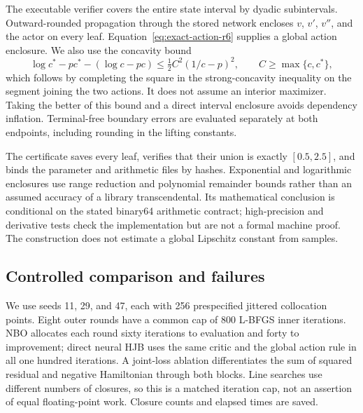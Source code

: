 The executable verifier covers the entire state interval by dyadic subintervals. Outward-rounded propagation through the stored network encloses $v$, $v'$, $v''$, and the actor on every leaf. Equation~\eqref{eq:exact-action-r6} supplies a global action enclosure. We also use the concavity bound
\begin{equation}\label{eq:concavity-gap-r6}
 \log c^*-pc^*-(\log c-pc)
 \leq \tfrac12 C^2(1/c-p)^2,\qquad C\geq\max\{c,c^*\},
\end{equation}
which follows by completing the square in the strong-concavity inequality on the segment joining the two actions. It does not assume an interior maximizer. Taking the better of this bound and a direct interval enclosure avoids dependency inflation. Terminal-free boundary errors are evaluated separately at both endpoints, including rounding in the lifting constants.

The certificate saves every leaf, verifies that their union is exactly $[0.5,2.5]$, and binds the parameter and arithmetic files by hashes. Exponential and logarithmic enclosures use range reduction and polynomial remainder bounds rather than an assumed accuracy of a library transcendental. Its mathematical conclusion is conditional on the stated binary64 arithmetic contract; high-precision and derivative tests check the implementation but are not a formal machine proof. The construction does not estimate a global Lipschitz constant from samples.

\subsection{Controlled comparison and failures}
We use seeds 11, 29, and 47, each with 256 prespecified jittered collocation points. Eight outer rounds have a common cap of 800 L-BFGS inner iterations. NBO allocates each round sixty iterations to evaluation and forty to improvement; direct neural HJB uses the same critic and the global action rule in all one hundred iterations. A joint-loss ablation differentiates the sum of squared residual and negative Hamiltonian through both blocks. Line searches use different numbers of closures, so this is a matched iteration cap, not an assertion of equal floating-point work. Closure counts and elapsed times are saved.

